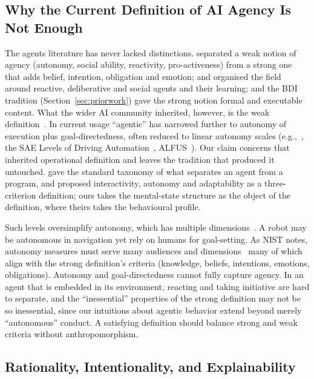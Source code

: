 \documentclass[letterpaper]{article} %
\theoremstyle{definition}
\begin{document}
\subsection{Why the Current Definition of AI Agency Is Not Enough}

The agents literature has never lacked distinctions. \citet{wooldridgeIntelligentAgentsTheory1995} separated a weak notion of agency (autonomy, social ability, reactivity, pro-activeness) from a strong one that adds belief, intention, obligation and emotion; \citet{stoneMultiagentSurveyML2000} and \citet{jenningsRoadmapAgentResearch1998} organised the field around reactive, deliberative and social agents and their learning; and the BDI tradition (Section~\ref{sec:priorwork}) gave the strong notion formal and executable content. What the wider AI community inherited, however, is the weak definition~\citep{luckConceptualFrameworkAgent2001}. In current usage ``agentic'' has narrowed further to autonomy of execution plus goal-directedness, often reduced to linear autonomy scales (e.g.,~\citep{shavitPracticesGoverningAgentic}, the SAE Levels of Driving Automation~\citep{vyasKeySafetyDesign}, ALFUS~\citep{huangAutonomyMeasuresRobots2008}). Our claim concerns that inherited operational definition and leaves the tradition that produced it untouched. \citet{franklinAgentOrProgram1997} gave the standard taxonomy of what separates an agent from a program, and \citet{floridiMoralityArtificialAgents2004} proposed interactivity, autonomy and adaptability as a three-criterion definition; ours takes the mental-state structure as the object of the definition, where theirs takes the behavioural profile.

Such levels oversimplify autonomy, which has multiple dimensions~\citep{staytonItsTimeRethink2020}. A robot may be autonomous in navigation yet rely on humans for goal-setting. As NIST notes, autonomy measures must serve many audiences and dimensions~\citep{huangFrameworkAutonomyLevels2005} many of which align with the strong definition's criteria (knowledge, beliefs, intentions, emotions, obligations). Autonomy and goal-directedness cannot fully capture agency. In an agent that is embedded in its environment, reacting and taking initiative are hard to separate, and the ``inessential'' properties of the strong definition may not be so inessential, since our intuitions about agentic behavior extend beyond merely ``autonomous'' conduct. A satisfying definition should balance strong and weak criteria without anthropomorphism.

\subsection{Rationality, Intentionality, and Explainability}
\end{document}
